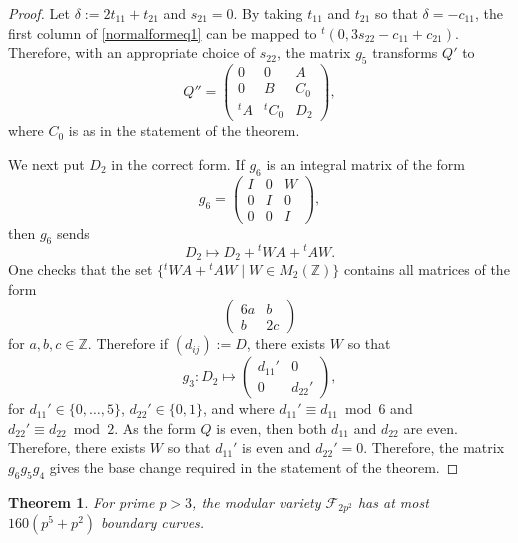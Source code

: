 \documentclass[11pt]{amsart}
\newtheorem{thm}{Theorem}[section]
\newcommand{\ZZ}{\mathbb{Z}}
\newcommand{\fc}{\mathcal{F}}
\begin{document}
\begin{proof}
Let $\delta:=2t_{11} + t_{21}$ and $s_{21}=0$.
By taking $t_{11}$ and $t_{21}$ so that $\delta = -c_{11}$, the first column of \eqref{normalformeq1} can be mapped to ${}^t(0, 3s_{22} - c_{11} + c_{21})$.
Therefore, with an appropriate choice of $s_{22}$, the matrix $g_5$ transforms $Q'$ to
\begin{equation*}
Q'' = 
\begin{pmatrix} 
0 & 0 & A \\ 
0 & B & C_0 \\ 
{}^tA & {}^tC_0 & D_2 
\end{pmatrix},
\end{equation*}
where $C_0$ is as in the statement of the theorem. 

We next put $D_2$ in the correct form. 
If $g_6$ is an integral matrix of the form 
\begin{equation*}
g_6 = 
\begin{pmatrix} 
I & 0 & W \\ 
0 & I & 0 \\ 
0 & 0 & I 
\end{pmatrix}, 
\end{equation*}
 then $g_6$ sends 
\begin{equation*}
D_2 \mapsto D_2 + {}^tW A + {}^tAW.
\end{equation*}
One checks that the set $\{ {}^tWA + {}^tAW \mid W \in M_2(\ZZ)\}$ contains all matrices of the form 
\begin{equation*}
\begin{pmatrix} 
6a & b \\ 
b & 2c 
\end{pmatrix}
\end{equation*}
for $a,b,c \in \ZZ$. 
Therefore if $(d_{ij}):=D$, there exists $W$ so that  
\begin{equation*}
g_3: D_2 
\mapsto 
\begin{pmatrix} 
d_{11}' & 0 \\ 
0 & d_{22}' 
\end{pmatrix},
\end{equation*}
for $d_{11}' \in \{0, \ldots, 5\}$, 
$d_{22}' \in \{0,1\}$, 
and where $d_{11}' \equiv d_{11} \bmod{6}$ and $d_{22}' \equiv d_{22} \bmod{2}$.
As the form $Q$ is even, then both $d_{11}$ and $d_{22}$ are even.
Therefore, there exists $W$ so that $d_{11}'$ is even and $d_{22}'=0$.
Therefore, the matrix $g_6 g_5 g_4$ gives the base change required in the statement of the theorem.
\end{proof}
\begin{thm}\label{boundaryboundsthm}
For prime $p>3$, the modular variety $\fc_{2p^2}$ has at most $160(p^5+p^2)$ boundary curves.
\end{thm}
\end{document}
